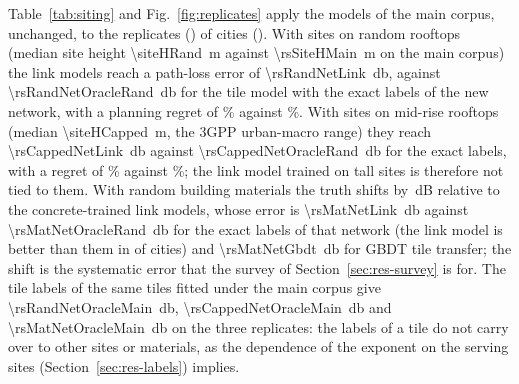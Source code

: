 \begin{table}[!tp]
\centering
\caption{Path-loss cut-off. Share of (pixel, site) pairs of the labelled
tiles beyond the \SI{\maxPl}{\decibel} cut-off and of links above
\SI{140}{\decibel}; median change of the tile exponent when the cut-off is
lowered to 140 and \SI{130}{\decibel}; for random tiles, median and 90th
percentile of the Tobit minus the least-squares slope.}
\label{tab:censoring}
\small
%
\end{table}

\begin{table}[!tp]
\centering
\caption{Network size: the same predictors on the \nSitesPerCity-site and on
the \nSitesSmall-site network (mean over held-out cities). PL: path-loss
RMSE; serv.: serving-site accuracy; SINR: mean absolute error; regret: $K=5$.}
\label{tab:density}
\small
%
\end{table}

Table~\ref{tab:siting} and Fig.~\ref{fig:replicates} apply the models of
the main corpus, unchanged, to the \nReplicatesWord{} replicates (\repList) of
\nRandCitiesWord{} cities (\randCities). With sites on random rooftops (median
site height \SI{\siteHRand}{\metre} against \SI{\rsSiteHMain}{\metre} on the
main corpus) the link models reach a path-loss error of
\SI{\rsRandNetLink}{\decibel}, against \SI{\rsRandNetOracleRand}{\decibel}
for the tile model with the exact labels of the new network, with a planning
regret of \rsRandRegretLink\% against \rsRandRegretOracleRand\%. With sites
on mid-rise rooftops (median \SI{\siteHCapped}{\metre}, the 3GPP
urban-macro range) they reach \SI{\rsCappedNetLink}{\decibel} against
\SI{\rsCappedNetOracleRand}{\decibel} for the exact labels, with a regret of
\rsCappedRegretLink\% against \rsCappedRegretOracleRand\%; the link model
trained on tall sites is therefore not tied to them. With random building
materials the truth shifts by \rsMatBiasLink{}\,dB relative to the
concrete-trained link models, whose error is \SI{\rsMatNetLink}{\decibel}
against \SI{\rsMatNetOracleRand}{\decibel} for the exact labels of that
network (the link model is better than them in \rsMatLinkBetterOracle{} of
\nRandCities{} cities) and \SI{\rsMatNetGbdt}{\decibel} for GBDT tile
transfer; the shift is the systematic error that the survey of
Section~\ref{sec:res-survey} is for. The tile labels of the same tiles
fitted under the main corpus give \SI{\rsRandNetOracleMain}{\decibel},
\SI{\rsCappedNetOracleMain}{\decibel} and \SI{\rsMatNetOracleMain}{\decibel}
on the three replicates: the labels of a tile do not carry over to other
sites or materials, as the dependence of the exponent on the serving sites
(Section~\ref{sec:res-labels}) implies.

